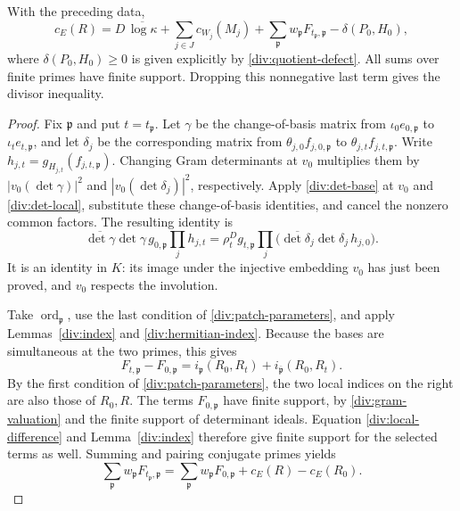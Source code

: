 \begin{theorem}\label{div:patch-formula}
With the preceding data,
\begin{equation}\label{div:exact-divisor}
 c_E(R)=D\,\overline{\log\kappa}+\sum_{j\in J}c_{W_j}(M_j)
     +\sum_{\mathfrak p}w_{\mathfrak p}F_{t_{\mathfrak p},\mathfrak p}
     -\delta(P_0,H_0),
\end{equation}
where $\delta(P_0,H_0)\ge0$ is given explicitly by
\eqref{div:quotient-defect}. All sums over finite primes have finite
support. Dropping this nonnegative last term gives the divisor inequality.
\end{theorem}
\begin{proof}
Fix $\mathfrak p$ and put $t=t_{\mathfrak p}$. Let $\gamma$ be the
change-of-basis matrix from $\iota_0e_{0,\mathfrak p}$ to
$\iota_te_{t,\mathfrak p}$, and let $\delta_j$ be the corresponding
matrix from $\theta_{j,0}f_{j,0,\mathfrak p}$ to
$\theta_{j,t}f_{j,t,\mathfrak p}$.
Write $h_{j,t}=g_{H_{j,t}}(f_{j,t,\mathfrak p})$.
Changing Gram determinants at $v_0$ multiplies them by
$|v_0(\det\gamma)|^2$ and $|v_0(\det\delta_j)|^2$, respectively.
Apply \eqref{div:det-base} at $v_0$ and
\eqref{div:det-local}, substitute these change-of-basis identities,
and cancel the nonzero common factors. The resulting identity is
\[
 \overline{\det\gamma}\det\gamma\,g_{0,\mathfrak p}
                  \prod_jh_{j,t}
 =\rho_t^D g_{t,\mathfrak p}
                  \prod_j\bigl(\overline{\det\delta_j}
                                    \det\delta_j\,h_{j,0}\bigr).
\]
It is an identity in $K$: its image under the injective embedding $v_0$
has just been proved, and $v_0$ respects the involution.

Take $\operatorname{ord}_{\mathfrak p}$, use the last condition of
\eqref{div:patch-parameters}, and apply Lemmas~\ref{div:index} and
\ref{div:hermitian-index}. Because the bases are simultaneous at the
two primes, this gives
\begin{equation}\label{div:local-difference}
 F_{t,\mathfrak p}-F_{0,\mathfrak p}
 =i_{\mathfrak p}(R_0,R_t)
       +i_{\overline{\mathfrak p}}(R_0,R_t).
\end{equation}
By the first condition of \eqref{div:patch-parameters}, the two local
indices on the right are also those of $R_0,R$.
The terms $F_{0,\mathfrak p}$ have finite support, by
\eqref{div:gram-valuation} and the finite support of determinant ideals.
Equation \eqref{div:local-difference} and Lemma~\ref{div:index} therefore
give finite support for the selected terms as well. Summing and pairing
conjugate primes yields
\begin{equation}\label{div:patch-sum}
 \sum_{\mathfrak p}w_{\mathfrak p}F_{t_{\mathfrak p},\mathfrak p}
 =\sum_{\mathfrak p}w_{\mathfrak p}F_{0,\mathfrak p}
       +c_E(R)-c_E(R_0).
\end{equation}


\end{proof}
